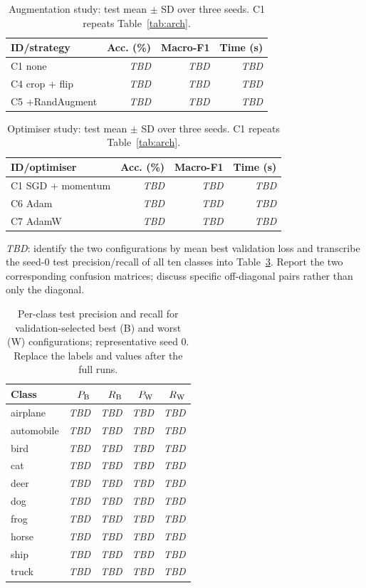 \documentclass[conference,onecolumn]{IEEEtran}
\newcommand{\tbd}{\textit{TBD}}
\begin{document}
\begin{table}[htbp]
\caption{Augmentation study: test mean $\pm$ SD over three seeds. C1 repeats Table~\ref{tab:arch}.}
\label{tab:aug}
\centering
\normalsize
\setlength{\tabcolsep}{8pt}
\begin{tabular}{@{}lrrr@{}}
\toprule
ID/strategy & Acc. (\%) & Macro-F1 & Time (s) \\
\midrule
C1 none & \tbd & \tbd & \tbd \\
C4 crop + flip & \tbd & \tbd & \tbd \\
C5 +RandAugment & \tbd & \tbd & \tbd \\
\bottomrule
\end{tabular}
\end{table}

\begin{table}[htbp]
\caption{Optimiser study: test mean $\pm$ SD over three seeds. C1 repeats Table~\ref{tab:arch}.}
\label{tab:opt}
\centering
\normalsize
\setlength{\tabcolsep}{8pt}
\begin{tabular}{@{}lrrr@{}}
\toprule
ID/optimiser & Acc. (\%) & Macro-F1 & Time (s) \\
\midrule
C1 SGD + momentum & \tbd & \tbd & \tbd \\
C6 Adam & \tbd & \tbd & \tbd \\
C7 AdamW & \tbd & \tbd & \tbd \\
\bottomrule
\end{tabular}
\end{table}

\tbd{}: identify the two configurations by mean best validation loss and
transcribe the seed-0 test precision/recall of all ten classes into
Table~\ref{tab:classes}. Report the two corresponding confusion matrices;
discuss specific off-diagonal pairs rather than only the diagonal.

\begin{table}[htbp]
\caption{Per-class test precision and recall for validation-selected best (B) and worst (W) configurations; representative seed 0. Replace the labels and values after the full runs.}
\label{tab:classes}
\centering
\normalsize
\setlength{\tabcolsep}{8pt}
\begin{tabular}{@{}lrrrr@{}}
\toprule
Class & $P_{\rm B}$ & $R_{\rm B}$ & $P_{\rm W}$ & $R_{\rm W}$ \\
\midrule
airplane   & \tbd & \tbd & \tbd & \tbd \\
automobile & \tbd & \tbd & \tbd & \tbd \\
bird       & \tbd & \tbd & \tbd & \tbd \\
cat        & \tbd & \tbd & \tbd & \tbd \\
deer       & \tbd & \tbd & \tbd & \tbd \\
dog        & \tbd & \tbd & \tbd & \tbd \\
frog       & \tbd & \tbd & \tbd & \tbd \\
horse      & \tbd & \tbd & \tbd & \tbd \\
ship       & \tbd & \tbd & \tbd & \tbd \\
truck      & \tbd & \tbd & \tbd & \tbd \\
\bottomrule
\end{tabular}
\end{table}
\end{document}

